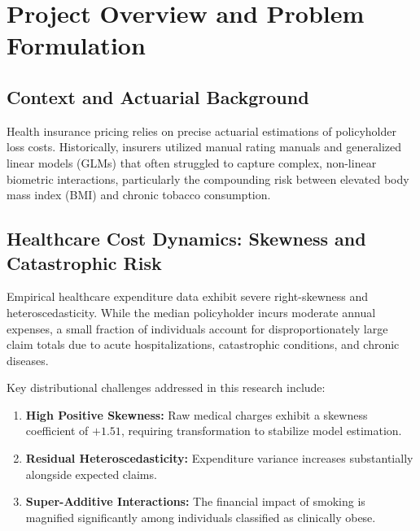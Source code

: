 \documentclass[12pt,a4paper]{report}
\begin{document}
\chapter{Project Overview and Problem Formulation}
\label{chap:overview}

\section{Context and Actuarial Background}
Health insurance pricing relies on precise actuarial estimations of policyholder loss costs. Historically, insurers utilized manual rating manuals and generalized linear models (GLMs) that often struggled to capture complex, non-linear biometric interactions, particularly the compounding risk between elevated body mass index (BMI) and chronic tobacco consumption.

\section{Healthcare Cost Dynamics: Skewness and Catastrophic Risk}
Empirical healthcare expenditure data exhibit severe right-skewness and heteroscedasticity. While the median policyholder incurs moderate annual expenses, a small fraction of individuals account for disproportionately large claim totals due to acute hospitalizations, catastrophic conditions, and chronic diseases.

Key distributional challenges addressed in this research include:
\begin{enumerate}
    \item \textbf{High Positive Skewness:} Raw medical charges exhibit a skewness coefficient of $+1.51$, requiring transformation to stabilize model estimation.
    \item \textbf{Residual Heteroscedasticity:} Expenditure variance increases substantially alongside expected claims.
    \item \textbf{Super-Additive Interactions:} The financial impact of smoking is magnified significantly among individuals classified as clinically obese.
\end{enumerate}
\end{document}
